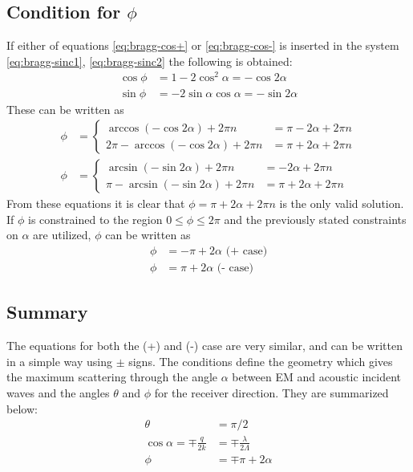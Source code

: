 \documentclass[10pt,a4paper]{eitExjobb}
\begin{document}
	\subsection{Condition for $\phi$}
	
	If either of equations \ref{eq:bragg-cos+} or \ref{eq:bragg-cos-} is inserted in the system \ref{eq:bragg-sinc1}, \ref{eq:bragg-sinc2} the following is obtained:
	\begin{align*}
	\cos{\phi} &= 1 - 2\cos^2{\alpha} = -\cos{2\alpha} \\
	\sin{\phi} &= -2\sin{\alpha}\cos{\alpha} = -\sin{2\alpha}
	\end{align*}
	These can be written as
	\begin{align*}
		\phi &=
		\begin{cases}
			\arccos(-\cos{2\alpha}) + 2\pi n &= \pi - 2\alpha + 2\pi n \\
			2\pi - \arccos(-\cos{2\alpha}) + 2\pi n &= \pi + 2\alpha + 2\pi n
		\end{cases} \\
		\phi &=
		\begin{cases}
		\arcsin(-\sin{2\alpha}) + 2\pi n &= -2\alpha + 2\pi n \\
		\pi - \arcsin(-\sin{2\alpha}) + 2\pi n &= \pi + 2\alpha + 2\pi n
		\end{cases}
	\end{align*}
	From these equations it is clear that $\phi = \pi + 2\alpha + 2\pi n$ is the only valid solution. If $\phi$ is constrained to the region $0 \leq \phi \leq 2\pi$ and the previously stated constraints on $\alpha$ are utilized, $\phi$ can be written as
	\begin{align*}
		\phi &= -\pi + 2\alpha \text{ (+ case)}\\
		\phi &= \pi + 2\alpha \text{ (- case)}
	\end{align*}
	
	\subsection{Summary}
	The equations for both the (+) and (-) case are very similar, and can be written in a simple way using $\pm$ signs. The conditions define the geometry which gives the maximum scattering through the angle $\alpha$ between EM and acoustic incident waves and the angles $\theta$ and $\phi$ for the receiver direction. They are summarized below:
	\begin{align}
	\theta &= \pi/2 \label{eq:bragg-theta}\\
	\cos{\alpha} = \mp \frac{q}{2k} &= \mp \frac{\lambda}{2\Lambda} \label{eq:bragg-alpha}\\
	\phi &= \mp \pi + 2\alpha \label{eq:bragg-phi}
	\end{align}
	
\end{document}

